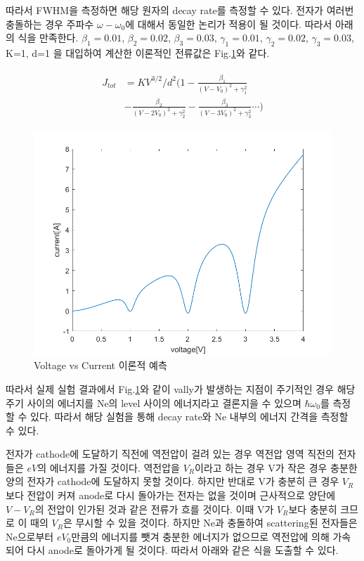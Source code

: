 \documentclass[%
 reprint,
 amsmath,amssymb,
 aps,
]{revtex4-2}
\begin{document}
따라서 FWHM을 측정하면 해당 원자의 decay rate를 측정할 수 있다. 전자가 여러번 충돌하는 경우 주파수 $\omega - \omega_{0}$에 대해서 동일한 논리가 적용이 될 것이다. 따라서 아래의 식을 만족한다. $\beta_{1} = 0.01$, $\beta_{2} = 0.02$, $\beta_{3} = 0.03$, $\gamma_{1} = 0.01$, $\gamma_{2} = 0.02$, $\gamma_{3} = 0.03$, K=1, d=1 을 대입하여 계산한 이론적인 전류값은 Fig.\ref{fig:SIM}와 같다.

\begin{align}
	\begin{aligned}
	J_{tot} &= KV^{3/2}/d^{2}\Bigg(1-\frac{\beta_{1}}{(V-V_{0})^{2}+\gamma_{1}^{2}} \\
	&-\frac{\beta_{2}}{(V-2V_{0})^{2}+\gamma_{2}^{2}} -\frac{\beta_{3}}{(V-3V_{0})^{2}+\gamma_{3}^{2}} \cdots \Bigg)
	\end{aligned}
\end{align}

\begin{figure}[htbp]
	\includegraphics[width = 0.85\linewidth]{SIM.png}%
	\caption{\label{fig:SIM}Voltage vs Current 이론적 예측}
\end{figure}

따라서 실제 실험 결과에서 Fig.\ref{fig:SIM}와 같이 vally가 발생하는 지점이 주기적인 경우 해당 주기 사이의 에너지를 Ne의 level 사이의 에너지라고 결론지을 수 있으며 $\hbar \omega_{0}$를 측정할 수 있다. 따라서 해당 실험을 통해 decay rate와 Ne 내부의 에너지 간격을 측정할 수 있다.

전자가 cathode에 도달하기 직전에 역전압이 걸려 있는 경우 역전압 영역 직전의 전자들은 $eV$의 에너지를 가질 것이다. 역전압을 $V_{R}$이라고 하는 경우 V가 작은 경우 충분한 양의 전자가 cathode에 도달하지 못할 것이다. 하지만 반대로 V가 충분히 큰 경우 $V_{R}$보다 전압이 커져 anode로 다시 돌아가는 전자는 없을 것이며 근사적으로 양단에 $V-V_{R}$의 전압이 인가된 것과 같은 전류가 흐를 것이다. 이때 V가 $V_{R}$보다 충분히 크므로 이 때의 $V_{R}$은 무시할 수 있을 것이다. 하지만 Ne과 충돌하여 scattering된 전자들은 Ne으로부터 $eV_{0}$만큼의 에너지를 뺏겨 충분한 에너지가 없으므로 역전압에 의해 가속되어 다시 anode로 돌아가게 될 것이다. 따라서 아래와 같은 식을 도출할 수 있다.
\end{document}
